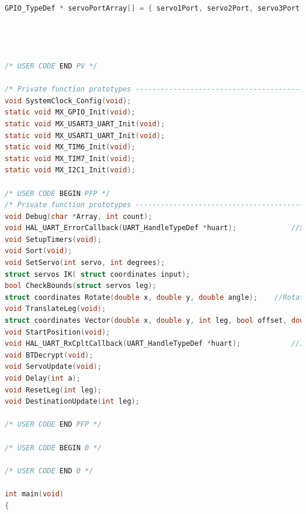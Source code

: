 \begin{lstlisting}[language = c]
GPIO_TypeDef * servoPortArray[] = {	servo1Port, servo2Port, servo3Port,
																		servo4Port, servo5Port, servo6Port,
																		servo7Port, servo8Port, servo9Port,
																		servo10Port, servo11Port, servo12Port,
																		servo13Port, servo14Port, servo15Port};
/* USER CODE END PV */

/* Private function prototypes -----------------------------------------------*/
void SystemClock_Config(void);
static void MX_GPIO_Init(void);
static void MX_USART3_UART_Init(void);
static void MX_USART1_UART_Init(void);
static void MX_TIM6_Init(void);
static void MX_TIM7_Init(void);
static void MX_I2C1_Init(void);

/* USER CODE BEGIN PFP */
/* Private function prototypes -----------------------------------------------*/
void Debug(char *Array, int count);														//Sends something to UART1 for debugging
void HAL_UART_ErrorCallback(UART_HandleTypeDef *huart);				//Sends error message with Debug()
void SetupTimers(void);																				//Configure timers 6 and 7 for use in servo control
void Sort(void);																							//Sorts timer values into ascending order
void SetServo(int servo, int degrees);												//Sets the timer value for a servo from a degree value
struct servos IK( struct coordinates input);									//Inverse Kinematics function
bool CheckBounds(struct servos leg);													//Check if legs need to be reset
struct coordinates Rotate(double x, double y, double angle);	//Rotate coordinates about an angle
void TranslateLeg(void);																			//Generates constants at beginning of program
struct coordinates Vector(double x, double y, int leg, bool offset, double r);
void StartPosition(void);																			//Resets robot to default position
void HAL_UART_RxCpltCallback(UART_HandleTypeDef *huart);			//ISR for when bluetooth communication is received.
void BTDecrypt(void);																//Resturns vectors sent from android
void ServoUpdate(void);																				//Moves entire buffer over at once to servos
void Delay(int a);																						//Delays program for a cycles of 20ms
void ResetLeg(int leg);																				//Moves the specified leg back to its origin
void DestinationUpdate(int leg);															//Calculates the new destination from the input vectors and the current values

/* USER CODE END PFP */

/* USER CODE BEGIN 0 */

/* USER CODE END 0 */

int main(void)
{


\end{lstlisting}
